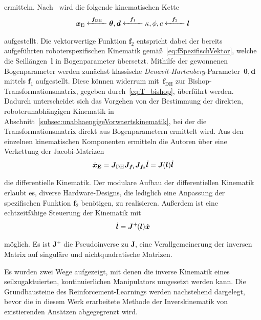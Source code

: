 ermitteln. Nach~\cite{JW06} wird die folgende kinematischen Kette
\begin{align}
\bm{x}_{\mathrm{E}} 
\stackrel{\bm{f}_{\mathrm{DH}}}{\parbox{1cm}{\leftarrowfill}} \bm{\theta}, \bm{d}
\stackrel{\bm{f}_1}{\parbox{1cm}{\leftarrowfill}} \kappa, \phi, c
\stackrel{\bm{f}_2}{\parbox{1cm}{\leftarrowfill}} \bm{l}
\label{eq:informationsflussJonesWalker}
\end{align}

aufgestellt. Die vektorwertige Funktion $\bm{f}_2$ entspricht dabei der bereits aufgeführten roboterspezifischen Kinematik gemäß~\eqref{eq:fSpezifischVektor}, welche die Seillängen~$\bm{l}$ in Bogenparameter übersetzt. Mithilfe der gewonnenen Bogenparameter werden zunächst klassische \textit{Denavit-Hartenberg}-Parameter~$\bm{\theta, \bm{d}}$ mittels $\bm{f}_1$ aufgestellt. Diese können widerrum mit~$\bm{f}_{\mathrm{DH}}$ zur Bishop-Transformationsmatrix, gegeben durch~\eqref{eq:T_bishop}, überführt werden. Dadurch unterscheidet sich das Vorgehen von der Bestimmung der direkten, roboterunabhängigen Kinematik in Abschnitt~\ref{subsec:unabhaengigeVorwaertskinematik}, bei der die Transformationsmatrix direkt aus Bogenparametern ermittelt wird. Aus den einzelnen kinematischen Komponenten ermitteln die Autoren über eine Verkettung der Jacobi-Matrizen
\begin{align}
\dot{\bm{x}}_{\bm{\mathrm{E}}} = \bm{J}_{\mathrm{DH}} \bm{J}_{\bm{f}_1} \bm{J}_{\bm{f}_2}  \dot{\bm{l}} 
= \bm{J}\mkern-1mu (\bm{l}) \dot{\bm{l}}
\label{eq:modulareDifferentielleKinematik}
\end{align}

die differentielle Kinematik. Der modulare Aufbau der differentiellen Kinematik erlaubt es, diverse Hardware-Designs, die lediglich eine Anpassung der spezifischen Funktion $\bm{f}_2$ benötigen, zu realisieren. Außerdem ist eine echtzeitfähige Steuerung der Kinematik mit
\begin{align}
\dot{\bm{l}} = \bm{J}^{+} \mkern-2mu(\bm{l}) \dot{\bm{x}}
\label{eq:inverseDifferentielleKinematik}
\end{align}

möglich. Es ist $\bm{J}^{+}$ die Pseudoinverse zu $\bm{J}$, eine Verallgemeinerung der inversen Matrix auf singuläre und nichtquadratische Matrizen. \newline

Es wurden zwei Wege aufgezeigt, mit denen die inverse Kinematik eines seilzugaktuierten, kontinuierlichen Manipulators umgesetzt werden kann. Die Grundbausteine des Reinforcement-Learnings werden nachstehend dargelegt, bevor die in diesem Werk erarbeitete Methode der Inverskinematik von existierenden Ansätzen abgegegrenzt wird.

